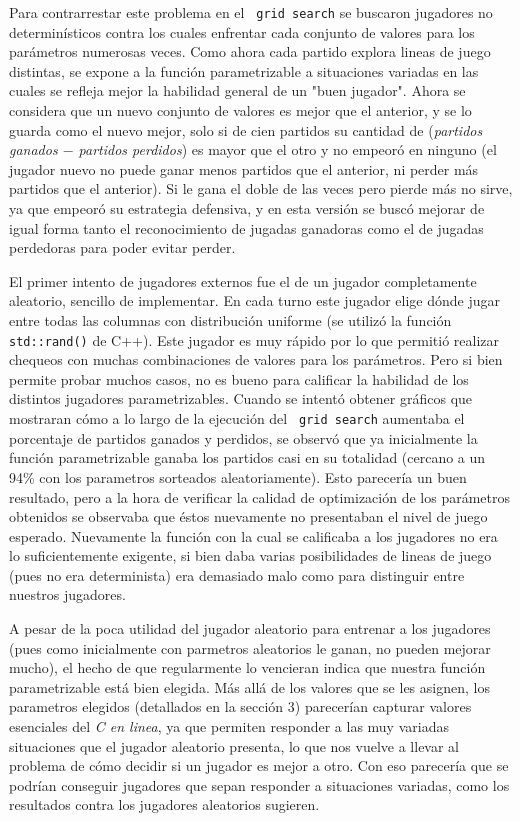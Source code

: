 \documentclass[A4paper,oneside,fleqn,11pt]{article}
\theoremstyle{definition}
\begin{document}
Para contrarrestar este problema en el \texttt{ grid search} se buscaron jugadores no determinísticos contra los cuales enfrentar cada conjunto de valores para los parámetros numerosas veces. Como ahora cada partido explora lineas de juego distintas, se expone a la función parametrizable a situaciones variadas en las cuales se refleja mejor la habilidad general de un "buen jugador". Ahora se considera que un nuevo conjunto de valores es mejor que el anterior, y se lo guarda como el nuevo mejor, solo si de cien partidos su cantidad de (\textit{partidos ganados $-$ partidos perdidos}) es mayor que el otro y no empeoró en ninguno (el jugador nuevo no puede ganar menos partidos que el anterior, ni perder más partidos que el anterior). Si le gana el doble de las veces pero pierde más no sirve, ya que empeoró su estrategia defensiva, y en esta versión se buscó mejorar de igual forma tanto el reconocimiento de jugadas ganadoras como el de jugadas perdedoras para poder evitar perder. 

El primer intento de jugadores externos fue el de un jugador completamente aleatorio, sencillo de implementar. En cada turno este jugador elige dónde jugar entre todas las columnas con distribución uniforme (se utilizó la función\texttt{ std::rand()} de C++). Este jugador es muy rápido por lo que permitió realizar chequeos con muchas combinaciones de valores para los parámetros. Pero si bien permite probar muchos casos, no es bueno para calificar la habilidad de los distintos jugadores parametrizables. Cuando se intentó obtener gráficos que mostraran cómo a lo largo de la ejecución del \texttt{ grid search} aumentaba el porcentaje de partidos ganados y perdidos, se observó que ya inicialmente la función parametrizable ganaba los partidos casi en su totalidad (cercano a un 94\% con los parametros sorteados aleatoriamente). Esto parecería un buen resultado, pero a la hora de verificar la calidad de optimización de los parámetros obtenidos se observaba que éstos nuevamente no presentaban el nivel de juego esperado. Nuevamente la función con la cual se calificaba a los jugadores no era lo suficientemente exigente, si bien daba varias posibilidades de lineas de juego (pues no era determinista) era demasiado malo como para distinguir entre nuestros jugadores. 

A pesar de la poca utilidad del jugador aleatorio para entrenar a los jugadores (pues como inicialmente con parmetros aleatorios le ganan, no pueden mejorar mucho), el hecho de que regularmente lo vencieran indica que nuestra función parametrizable está bien elegida. Más allá de los valores que se les asignen, los parametros elegidos (detallados en la sección 3) parecerían capturar valores esenciales del \textit{C en linea}, ya que permiten responder a las muy variadas situaciones que el jugador aleatorio presenta, lo que nos vuelve a llevar al problema de cómo decidir si un jugador es mejor a otro. Con eso parecería que se podrían conseguir jugadores que sepan responder a situaciones variadas, como los resultados contra los jugadores aleatorios sugieren.
\end{document}
